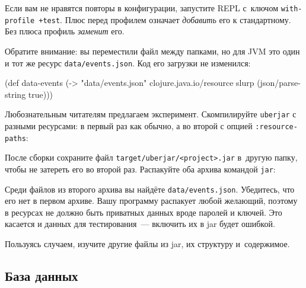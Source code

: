 
Если вам не нравятся повторы в конфигурации, запустите REPL с~ключом
\verb|with-profile +test|. Плюс перед профилем означает \emph{добавить} его к
стандартному. Без плюса профиль \emph{заменит} его.


Обратите внимание: вы переместили файл между папками, но для JVM это один и тот
же ресурс \verb|data/events.json|. Код его загрузки не изменился:

\begin{english}
  \begin{clojure}
(def data-events
  (-> "data/events.json"
      clojure.java.io/resource
      slurp
      (json/parse-string true)))
  \end{clojure}
\end{english}


Любознательным читателям предлагаем эксперимент. Скомпилируйте \verb|uberjar|
с разными ресурсами: в первый раз как обычно, а во второй с опцией
\verb|:resource-paths|:

\begin{english}
  \begin{clojure}
:profiles {:uberjar {:resource-paths ["env/test/resources"]}
  \end{clojure}
\end{english}


После сборки сохраните файл \verb|target/uberjar/<project>.jar| в~другую папку,
чтобы не затереть его во второй раз. Распакуйте оба архива командой \verb|jar|:

\begin{english}
\end{english}

Среди файлов из второго архива вы найдёте \verb|data/events.json|. Убедитесь,
что его нет в первом архиве. Вашу программу распакует любой желающий, поэтому в
ресурсах не должно быть приватных данных вроде паролей и ключей. Это касается и
данных для тестирования~--- включить их в jar будет ошибкой.

Пользуясь случаем, изучите другие файлы из jar, их структуру и~содержимое.

\subsection{База данных}

